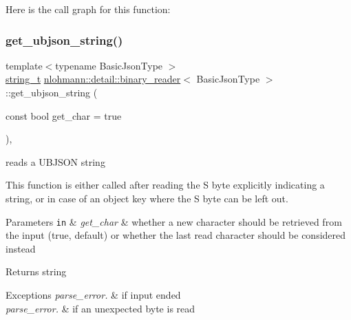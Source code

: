 Here is the call graph for this function\+:
\mbox{\label{classnlohmann_1_1detail_1_1binary__reader_ae4097317b979174cc366b076bb879814}} 
\subsubsection{\texorpdfstring{get\+\_\+ubjson\+\_\+string()}{get\_ubjson\_string()}}
{\footnotesize\ttfamily template$<$typename Basic\+Json\+Type $>$ \\
\hyperlink{classnlohmann_1_1detail_1_1binary__reader_a889a8702ca8aa45e99136bc31ea898e9}{string\+\_\+t} \hyperlink{classnlohmann_1_1detail_1_1binary__reader}{nlohmann\+::detail\+::binary\+\_\+reader}$<$ Basic\+Json\+Type $>$\+::get\+\_\+ubjson\+\_\+string (\begin{DoxyParamCaption}\item[{const bool}]{get\+\_\+char = {\ttfamily true} }\end{DoxyParamCaption})\hspace{0.3cm}{\ttfamily [inline]}, {\ttfamily [private]}}



reads a U\+B\+J\+S\+ON string 

This function is either called after reading the \textquotesingle{}S\textquotesingle{} byte explicitly indicating a string, or in case of an object key where the \textquotesingle{}S\textquotesingle{} byte can be left out.


\begin{DoxyParams}[1]{Parameters}
\mbox{\tt in}  & {\em get\+\_\+char} & whether a new character should be retrieved from the input (true, default) or whether the last read character should be considered instead\\
\hline
\end{DoxyParams}
\begin{DoxyReturn}{Returns}
string
\end{DoxyReturn}

\begin{DoxyExceptions}{Exceptions}
{\em parse\+\_\+error.} & if input ended \\
\hline
{\em parse\+\_\+error.} & if an unexpected byte is read \\
\hline
\end{DoxyExceptions}



